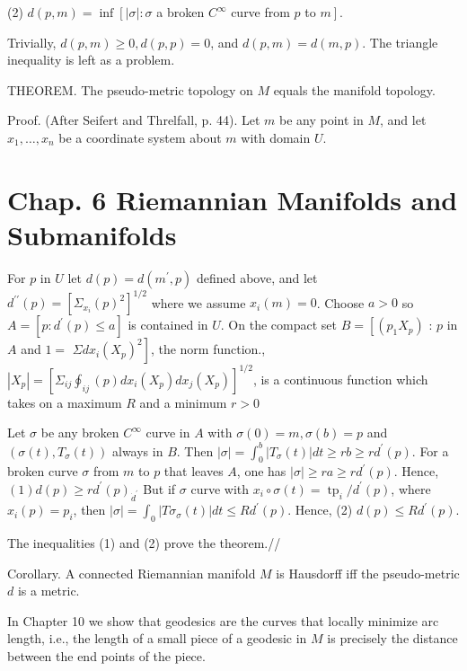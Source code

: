 \documentclass[10pt]{article}
\begin{document}
(2) $d(p, m)=\inf \left[|\sigma|: \sigma\right.$ a broken $C^{\infty}$ curve from $p$ to $\left.m\right] .$

Trivially, $d(p, m) \geq 0, d(p, p)=0$, and $d(p, m)=d(m, p)$. The triangle inequality is left as a problem.

THEOREM. The pseudo-metric topology on $M$ equals the manifold topology.

Proof. (After Seifert and Threlfall, p. 44). Let $m$ be any point in $M$, and let $x_{1}, \ldots, x_{n}$ be a coordinate system about $m$ with domain $U$.

\section{Chap. 6 Riemannian Manifolds and Submanifolds}
For $p$ in $U$ let $d(p)=d\left(m^{\prime}, p\right)$ defined above, and let $d^{\prime \prime}(p)=\left[\Sigma_{x_{i}}(p)^{2}\right]^{1 / 2}$ where we assume $x_{i}(m)=0$. Choose $a>0$ so $A=\left[p: d^{\prime}(p) \leq a\right]$ is contained in $U$. On the compact set $B=\left[\left(p_{1} X_{p}\right)\right.$ : $p$ in $A$ and $1=$ $\left.\Sigma d x_{i}\left(X_{p}\right)^{2}\right]$, the norm function., $\left|X_{p}\right|=\left[\Sigma_{i j} \oint_{i j}(p) d x_{i}\left(X_{p}\right) d x_{j}\left(X_{p}\right)\right]^{1 / 2}$, is a continuous function which takes on a maximum $R$ and a minimum $r>0$

Let $\sigma$ be any broken $C^{\infty}$ curve in $A$ with $\sigma(0)=m, \sigma(b)=p$ and $\left(\sigma(t), T_{\sigma}(t)\right)$ always in $B$. Then $|\sigma|=\int_{0}^{b}\left|T_{\sigma}(t)\right| d t \geq r b \geq r d^{\prime}(p)$. For a broken curve $\sigma$ from $m$ to $p$ that leaves $A$, one has $|\sigma| \geq r a \geq r d^{\prime}(p)$. Hence, $(1) d(p) \geq r d^{\prime}(p)_{\dot{d}^{\prime}}$ But if $\sigma$ curve with $x_{i} \circ \sigma(t)=\operatorname{tp}_{i} / d^{\prime}(p)$, where $x_{i}(p)=p_{i}$, then $|\sigma|=\int_{0}\left|T \sigma_{\sigma}(t)\right| d t \leq R d^{\prime}(p) .$ Hence, (2) $d(p) \leq R d^{\prime}(p)$.

The inequalities (1) and (2) prove the theorem.//

Corollary. A connected Riemannian manifold $M$ is Hausdorff iff the pseudo-metric $d$ is a metric.

In Chapter 10 we show that geodesics are the curves that locally minimize arc length, i.e., the length of a small piece of a geodesic in $M$ is precisely the distance between the end points of the piece.
\end{document}
